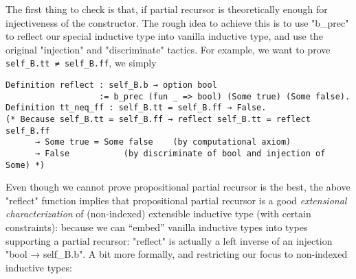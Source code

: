 The first thing to check is that, if partial recursor is theoretically enough for injectiveness of the constructor. The rough idea to achieve this
is to use "b_prec" to reflect our special inductive type into vanilla
inductive type, and use the original "injection" and "discriminate"
tactics. For example, we want to prove \texttt{self_B.tt ≠
self_B.ff}, we simply 
\begin{verbatim}
Definition reflect : self_B.b → option bool 
                   := b_prec (fun _ => bool) (Some true) (Some false).
Definition tt_neq_ff : self_B.tt = self_B.ff → False.
(* Because self_B.tt = self_B.ff → reflect self_B.tt = reflect self_B.ff 
      → Some true = Some false    (by computational axiom)
      → False           (by discriminate of bool and injection of Some) *)
\end{verbatim}


Even though we cannot prove propositional partial recursor is the best,
the above "reflect" function implies that propositional partial
recursor is a good \textit{extensional characterization} of (non-indexed) extensible inductive type (with certain constraints): because we can ``embed'' vanilla inductive types into
types supporting a partial recursor: "reflect" is actually a left
inverse of an injection "bool → self_B.b". A bit more formally, and
restricting our focus to non-indexed inductive types:


